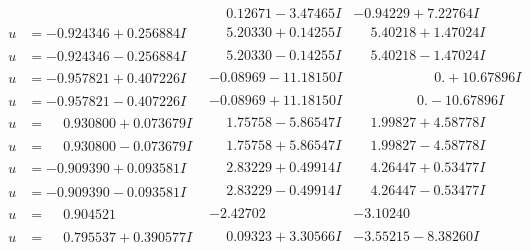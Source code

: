 \documentclass[1p]{elsarticle_modified}
\theoremstyle{definition}
\begin{document}
$$\begin{array}{c|c|c}
 & \phantom{-}0.12671 - 3.47465 I & -0.94229 + 7.22764 I \\ \hline\begin{aligned}
u &= -0.924346 + 0.256884 I\end{aligned}
 & \phantom{-}5.20330 + 0.14255 I & \phantom{-}5.40218 + 1.47024 I \\ \hline\begin{aligned}
u &= -0.924346 - 0.256884 I\end{aligned}
 & \phantom{-}5.20330 - 0.14255 I & \phantom{-}5.40218 - 1.47024 I \\ \hline\begin{aligned}
u &= -0.957821 + 0.407226 I\end{aligned}
 & -0.08969 - 11.18150 I & \phantom{-0.000000 -}0. + 10.67896 I \\ \hline\begin{aligned}
u &= -0.957821 - 0.407226 I\end{aligned}
 & -0.08969 + 11.18150 I & \phantom{-0.000000 } 0. - 10.67896 I \\ \hline\begin{aligned}
u &= \phantom{-}0.930800 + 0.073679 I\end{aligned}
 & \phantom{-}1.75758 - 5.86547 I & \phantom{-}1.99827 + 4.58778 I \\ \hline\begin{aligned}
u &= \phantom{-}0.930800 - 0.073679 I\end{aligned}
 & \phantom{-}1.75758 + 5.86547 I & \phantom{-}1.99827 - 4.58778 I \\ \hline\begin{aligned}
u &= -0.909390 + 0.093581 I\end{aligned}
 & \phantom{-}2.83229 + 0.49914 I & \phantom{-}4.26447 + 0.53477 I \\ \hline\begin{aligned}
u &= -0.909390 - 0.093581 I\end{aligned}
 & \phantom{-}2.83229 - 0.49914 I & \phantom{-}4.26447 - 0.53477 I \\ \hline\begin{aligned}
u &= \phantom{-}0.904521\phantom{ +0.000000I}\end{aligned}
 & -2.42702\phantom{ +0.000000I} & -3.10240\phantom{ +0.000000I} \\ \hline\begin{aligned}
u &= \phantom{-}0.795537 + 0.390577 I\end{aligned}
 & \phantom{-}0.09323 + 3.30566 I & -3.55215 - 8.38260 I \\ \hline\begin{aligned}

\end{aligned}
\end{array}$$
\end{document}
